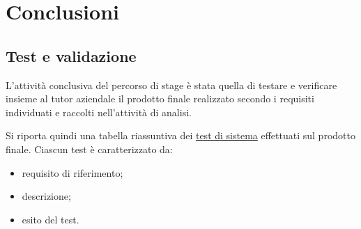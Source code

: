 \chapter{Conclusioni}
\label{cap:conclusioni}


\setlength{\parskip}{3ex}

\section{Test e validazione}
L'attività conclusiva del percorso di stage è stata quella di testare e verificare insieme al tutor aziendale il prodotto finale realizzato secondo i requisiti individuati e raccolti nell'attività di analisi.

\setlength{\parskip}{3ex} 

\noindent Si riporta quindi una tabella riassuntiva dei {\hyperref[para:test-definition]{test di sistema}}\glsfirstoccur \; effettuati sul prodotto finale. Ciascun test è caratterizzato da:
\begin{itemize}
\item requisito di riferimento;
\item descrizione;
\item esito del test.
\end{itemize}

\pagebreak

